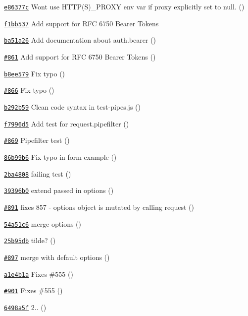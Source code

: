 \begin{DoxyItemize}
\item \href{https://github.com/mikeal/request/commit/e86377c0c1e7695c3997f7802175ca37f5a5113b}{\tt e86377c} Won\textquotesingle{}t use H\+T\+T\+P(\+S)\+\_\+\+P\+R\+O\+X\+Y env var if proxy explicitly set to null. ()
\item \href{https://github.com/mikeal/request/commit/f1bb537ee2440bd664ea8c445ac3a2c6e31e9932}{\tt f1bb537} Add support for R\+F\+C 6750 Bearer Tokens
\item \href{https://github.com/mikeal/request/commit/ba51a26079ec52c0a9145fbe8b6796d46e79bb8e}{\tt ba51a26} Add documentation about auth.\+bearer ()
\item \href{https://github.com/mikeal/request/pull/861}{\tt \#861} Add support for R\+F\+C 6750 Bearer Tokens ()
\item \href{https://github.com/mikeal/request/commit/b8ee5790ace95440a56074f6afe866f4662e9e88}{\tt b8ee579} Fix typo ()
\item \href{https://github.com/mikeal/request/pull/866}{\tt \#866} Fix typo ()
\item \href{https://github.com/mikeal/request/commit/b292b59fadecb35dac3bee0959c4b4b782e772e3}{\tt b292b59} Clean code syntax in test-\/pipes.\+js ()
\item \href{https://github.com/mikeal/request/commit/f7996d5fcfed85e03f293a7c9739e385b64ecaad}{\tt f7996d5} Add test for request.\+pipefilter ()
\item \href{https://github.com/mikeal/request/pull/869}{\tt \#869} Pipefilter test ()
\item \href{https://github.com/mikeal/request/commit/86b99b671a3c86f4f963a6c67047343fd8edae8f}{\tt 86b99b6} Fix typo in form example ()
\item \href{https://github.com/mikeal/request/commit/2ba48083ddf2607f85e2c479e0d254483c2610fe}{\tt 2ba4808} failing test ()
\item \href{https://github.com/mikeal/request/commit/39396b0bb2e90eb7ec4dfcf5d2e731a2cb156f5c}{\tt 39396b0} extend passed in options ()
\item \href{https://github.com/mikeal/request/pull/891}{\tt \#891} fixes 857 -\/ options object is mutated by calling request ()
\item \href{https://github.com/mikeal/request/commit/54a51c665887e162ccb9f6b17b9c1f3b017ccc29}{\tt 54a51c6} merge options ()
\item \href{https://github.com/mikeal/request/commit/25b95dbdddf874f014386a0a9fe35a7c903b7415}{\tt 25b95db} tilde? ()
\item \href{https://github.com/mikeal/request/pull/897}{\tt \#897} merge with default options ()
\item \href{https://github.com/mikeal/request/commit/a1e4b1a9c2f39ce565fd023bb604da139f689d43}{\tt a1e4b1a} Fixes \#555 ()
\item \href{https://github.com/mikeal/request/pull/901}{\tt \#901} Fixes \#555 ()
\item \href{https://github.com/mikeal/request/commit/6498a5f1ae68050cfeabf8f34f75bc72b08f1805}{\tt 6498a5f} 2.. ()
\end{DoxyItemize}

